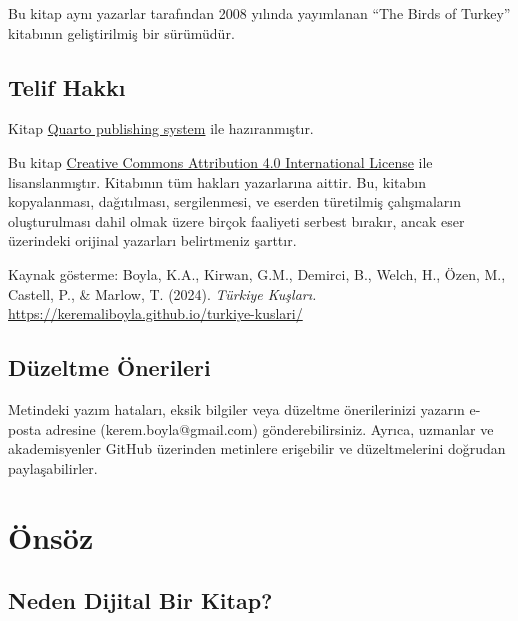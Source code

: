 \documentclass[
  a4paper,
  DIV=11,
  numbers=noendperiod]{scrreprt}
\begin{document}
Bu kitap aynı yazarlar tarafından 2008 yılında yayımlanan ``The Birds of
Turkey'' kitabının geliştirilmiş bir sürümüdür.

\section*{Telif Hakkı}\label{telif-hakkux131}


Kitap \href{https://quarto.org/}{Quarto publishing system} ile
hazıranmıştır.

Bu kitap \href{https://creativecommons.org/licenses/by/4.0/}{Creative
Commons Attribution 4.0 International License} ile lisanslanmıştır.
Kitabının tüm hakları yazarlarına aittir. Bu, kitabın kopyalanması,
dağıtılması, sergilenmesi, ve eserden türetilmiş çalışmaların
oluşturulması dahil olmak üzere birçok faaliyeti serbest bırakır, ancak
eser üzerindeki orijinal yazarları belirtmeniz şarttır.

Kaynak gösterme: Boyla, K.A., Kirwan, G.M., Demirci, B., Welch, H.,
Özen, M., Castell, P., \& Marlow, T. (2024). \emph{Türkiye Kuşları.}
\url{https://keremaliboyla.github.io/turkiye-kuslari/}

\section*{Düzeltme Önerileri}\label{duxfczeltme-uxf6nerileri}


Metindeki yazım hataları, eksik bilgiler veya düzeltme önerilerinizi
yazarın e-posta adresine (kerem.boyla@gmail.com) gönderebilirsiniz.
Ayrıca, uzmanlar ve akademisyenler GitHub üzerinden metinlere erişebilir
ve düzeltmelerini doğrudan paylaşabilirler.


\chapter*{Önsöz}\label{uxf6nsuxf6z}


\section*{Neden Dijital Bir Kitap?}\label{neden-dijital-bir-kitap}
\end{document}
